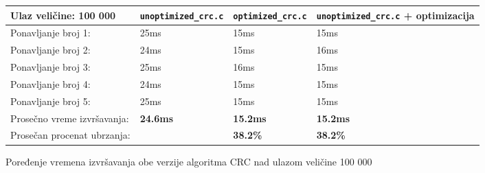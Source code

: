 \documentclass[12pt,oneside]{memoir}
\begin{document}


 

\begin{figure}[!ht]
\begin{center}
\begin{tabular}{ | m{5.5cm} | m{2.7cm}| m{2.5cm} | m{2.7cm} | }
      \hline
     Ulaz veličine: 100 000 & \texttt{unoptimized}\-\texttt{\_crc.c} & \texttt{optimized}\-\texttt{\_crc.c} & \texttt{unoptimized}\-\texttt{\_crc.c} + optimizacija\\ 
      \hline
      Ponavljanje broj 1: & 25ms & 15ms & 15ms\\
      \hline
      Ponavljanje broj 2: & 24ms & 15ms & 16ms\\
      \hline
      Ponavljanje broj 3: & 25ms & 16ms & 15ms\\
      \hline
      Ponavljanje broj 4: & 24ms & 15ms & 15ms\\
      \hline
      Ponavljanje broj 5: & 25ms & 15ms & 15ms\\
      \hline
      Prosečno vreme izvršavanja: & \textbf{24.6ms} & \textbf{15.2ms} & \textbf{15.2ms}\\
      \hline
      Prosečan procenat ubrzanja: &  & \textbf{38.2\%} & \textbf{38.2\%} \\
      \hline
\end{tabular}
\end{center}
\caption{Poređenje vremena izvršavanja obe verzije algoritma CRC nad ulazom veličine 100 000}
\label{table_100k}
\end{figure}
\end{document}
